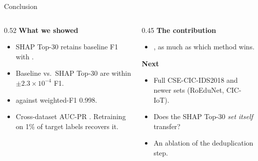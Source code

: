 \documentclass[aspectratio=169, 11pt]{beamer}
\begin{document}
\begin{frame}{Conclusion}
  \begin{columns}[T]
    \begin{column}{0.52\textwidth}
      \textbf{What we showed}
      \begin{itemize}
        \item SHAP Top-30 retains baseline F1 with .
        \item Baseline vs.\ SHAP Top-30 are  within
              $\pm2.3\times10^{-4}$ F1.
        \item {} against weighted-F1 0.998.
        \item Cross-dataset AUC-PR . Retraining on 1\% of target labels recovers it.
      \end{itemize}
    \end{column}
    \begin{column}{0.45\textwidth}
      \textbf{The contribution}
      \begin{itemize}\small
        \item {}, as much as which method wins.
      \end{itemize}
      \textbf{Next}
      \begin{itemize}\small
        \item Full CSE-CIC-IDS2018 and newer sets (RoEduNet, CIC-IoT).
        \item Does the SHAP Top-30 \emph{set itself} transfer?
        \item An ablation of the deduplication step.
      \end{itemize}
    \end{column}
  \end{columns}
  \vfill
  \centering {}
\end{frame}
\end{document}
